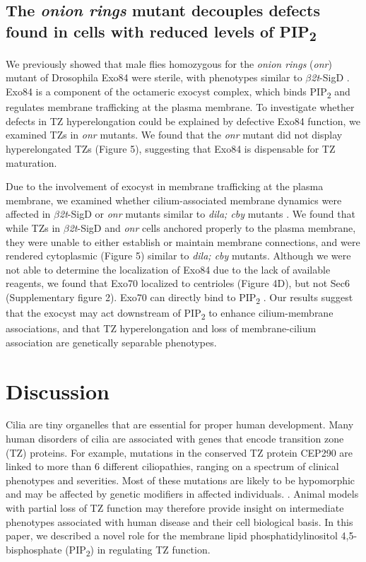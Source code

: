 \documentclass[12pt, twoside, letterpaper]{article}
\newcommand{\PIP}{PIP\textsubscript{2}}
\newcommand{\sigd}{$\beta$\textit{2t}-SigD}
\begin{document}
\subsection{The \textit{onion rings} mutant decouples defects found in cells with reduced levels of \PIP{}}
We previously showed that male flies homozygous for the \textit{onion rings}
(\textit{onr}) mutant of Drosophila Exo84 were sterile, with phenotypes
similar to \sigd{} \citep{wei2008depletion}.
Exo84 is a component of the octameric exocyst complex, which binds
\PIP{} and regulates membrane trafficking at the plasma membrane.
To investigate whether defects in TZ hyperelongation could be explained by
defective Exo84 function, we examined TZs in \textit{onr} mutants.
We found that the \textit{onr} mutant did not display hyperelongated TZs (Figure 5),
suggesting that Exo84 is dispensable for TZ maturation.

Due to the involvement of exocyst in membrane trafficking at the plasma membrane,
we examined whether cilium-associated membrane dynamics were affected in \sigd{}
or \textit{onr} mutants similar to \textit{dila; cby} mutants
\citep{vieillard2016transition}.
We found that while TZs in \sigd{} and \textit{onr} cells anchored properly
to the plasma membrane, they were unable to either establish or maintain
membrane connections, and were rendered cytoplasmic (Figure 5) similar to
\textit{dila; cby} mutants.
Although we were not able to determine the localization of Exo84 due to the
lack of available reagents,
we found that Exo70 localized to centrioles (Figure 4D),
but not Sec6 (Supplementary figure 2).
Exo70 can directly bind to \PIP{} \citep{he2007exo70}.
Our results suggest that the exocyst may act downstream of \PIP{} to
enhance cilium-membrane associations, and that TZ hyperelongation and loss of
membrane-cilium association are genetically separable phenotypes.


\section{Discussion}
Cilia are tiny organelles that are essential for proper human development.
Many human disorders of cilia are associated with genes that encode
transition zone (TZ) proteins.
For example, mutations in the conserved TZ protein CEP290
are linked to more than 6 different ciliopathies,
ranging on a spectrum of clinical phenotypes and severities.
Most of these mutations are likely to be hypomorphic
and may be affected by genetic modifiers in affected individuals.
\citep{zaghloul2010functional, khanna2009common, leitch2008hypomorphic}.
Animal models with partial loss of TZ function may therefore
provide insight on intermediate phenotypes associated with human disease
and their cell biological basis.
In this paper, we described a novel role for the membrane lipid
phosphatidylinositol 4,5-bisphosphate (\PIP{}) in regulating TZ function.
\end{document}
